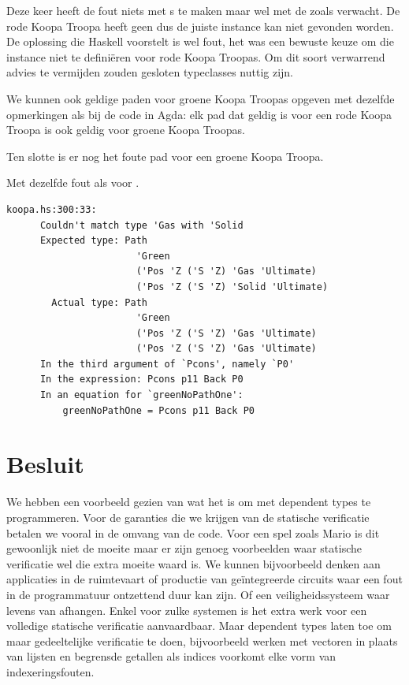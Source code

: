 Deze keer heeft de fout niets met s te maken maar wel met de
 zoals verwacht. De rode Koopa Troopa heeft geen
  dus de juiste instance kan niet gevonden worden.
De oplossing die Haskell voorstelt is wel fout, het was een bewuste keuze om
die instance niet te definiëren voor rode Koopa Troopas. Om dit soort
verwarrend advies te vermijden zouden gesloten typeclasses nuttig zijn.

We kunnen ook geldige paden voor groene Koopa Troopas opgeven met dezelfde
opmerkingen als bij de code in Agda: elk pad dat geldig is voor een rode Koopa
Troopa is ook geldig voor groene Koopa Troopas.


Ten slotte is er nog het foute pad voor een groene Koopa Troopa.


Met dezelfde fout als voor .

\begin{Verbatim}[fontsize=\small]
  koopa.hs:300:33:
      Couldn't match type 'Gas with 'Solid
      Expected type: Path
                       'Green
                       ('Pos 'Z ('S 'Z) 'Gas 'Ultimate)
                       ('Pos 'Z ('S 'Z) 'Solid 'Ultimate)
        Actual type: Path
                       'Green
                       ('Pos 'Z ('S 'Z) 'Gas 'Ultimate)
                       ('Pos 'Z ('S 'Z) 'Gas 'Ultimate)
      In the third argument of `Pcons', namely `P0'
      In the expression: Pcons p11 Back P0
      In an equation for `greenNoPathOne':
          greenNoPathOne = Pcons p11 Back P0
\end{Verbatim}


\section{Besluit}

We hebben een voorbeeld gezien van wat het is om met dependent types te
programmeren. Voor de garanties die we krijgen van de statische verificatie
betalen we vooral in de omvang van de code. Voor een spel zoals Mario is dit
gewoonlijk niet de moeite maar er zijn genoeg voorbeelden waar statische
verificatie wel die extra moeite waard is. We kunnen bijvoorbeeld  denken aan
applicaties in de ruimtevaart of productie van geïntegreerde circuits
waar een fout in de programmatuur ontzettend duur kan zijn. Of een
veiligheidssysteem waar levens van afhangen. Enkel voor zulke systemen is het
extra werk voor een volledige statische verificatie aanvaardbaar. Maar
dependent types laten toe om maar gedeeltelijke verificatie te doen,
bijvoorbeeld werken met vectoren in plaats van lijsten en begrensde getallen
als indices voorkomt elke vorm van indexeringsfouten.

